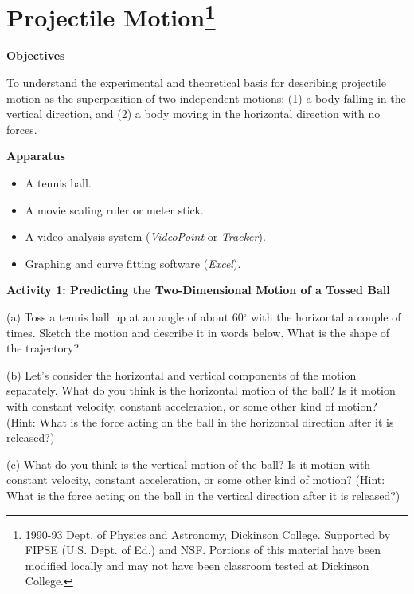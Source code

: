 
\section{Projectile Motion\footnote{
1990-93 Dept. of Physics and Astronomy, Dickinson College. Supported by FIPSE
(U.S. Dept. of Ed.) and NSF. Portions of this material have been modified locally
and may not have been classroom tested at Dickinson College.
}}

\makelabheader %

\textbf{Objectives }

To understand the experimental and theoretical basis for describing projectile
motion as the superposition of two independent motions: (1) a body falling in
the vertical direction, and (2) a body moving in the horizontal direction with
no forces.

\textbf{Apparatus}

\begin{itemize}
\item A tennis ball. 
\item A movie scaling ruler or meter stick.
\item A video analysis system (\textit{VideoPoint} or \textit{Tracker}). 
\item Graphing and curve fitting software (\textit{Excel}).
\end{itemize}
\textbf{Activity 1: Predicting the Two-Dimensional Motion of a Tossed Ball }

(a) Toss a tennis ball up at an angle of about 60\( ^{\circ } \) with the horizontal
a couple of times. Sketch the motion and describe it in words below. What is
the shape of the trajectory?
\vspace{20mm}

(b) Let's consider the horizontal and vertical components of the motion separately.
What do you think is the horizontal motion of the ball? Is it motion with constant
velocity, constant acceleration, or some other kind of motion? (Hint: What
is the force acting on the ball in the horizontal direction after it is released?)
\vspace{20mm}

(c) What do you think is the vertical motion of the ball? Is it motion with
constant velocity, constant acceleration, or some other kind of motion?
(Hint: What is the force acting on the ball in the vertical direction after
it is released?)
\vspace{20mm}

